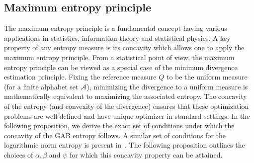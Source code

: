 \documentclass[11pt]{article}
\theoremstyle{plain}
\newtheorem{proposition}{Proposition}
\theoremstyle{remark}
\def\R{\mathbb{R}}
\def\Z{\mathbb{Z}}
\newcommand{\Acal}{\mathcal{A}}
\newcommand{\Mfrak}{\mathfrak{M}}
\newcommand{\eGAB}{\mathcal{E}_{\mathrm{GAB}}}
\newcommand{\todo}[1]{\textcolor{red}{#1}}
\begin{document}


\subsection{Maximum entropy principle}\label{sec:maxent-distn}

The maximum entropy principle is a fundamental concept having various applications in statistics, information theory and statistical physics. A key property of any entropy measure is its concavity which allows one to apply the maximum entropy principle. From a statistical point of view, the maximum entropy principle can be viewed as a special case of the minimum divergence estimation principle. Fixing the reference measure $Q$ to be the uniform measure (for a finite alphabet set $\Acal$), minimizing the divergence to a uniform measure is mathematically equivalent to maximizing the associated entropy. The concavity of the entropy (and convexity of the divergence) ensures that these optimization problems are well-defined and have unique optimizer in standard settings. In the following proposition, we derive the exact set of conditions under which the concavity of the GAB entropy follows. A similar set of conditions for the logarithmic norm entropy is present in~\cite{ghosh2021scale}. The following proposition outlines the choices of $\alpha, \beta$ and $\psi$ for which this concavity property can be attained.
\end{document}
